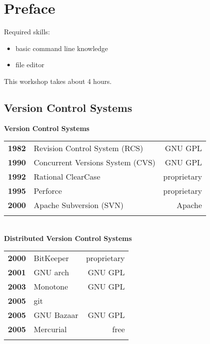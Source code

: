 \section{Preface}
\begin{frame}
  \slidetitle

  Required skills:
  \begin{itemize}
    \item basic command line knowledge
    \item file editor
  \end{itemize}
  \vspace{1em}
  This workshop takes about 4 hours.
\end{frame}

\subsection{Version Control Systems}
\begin{frame}
  \subslidetitle

  \textbf{Version Control Systems}
  \pause
  \\
  \begin{tabular}{lp{5cm}r}
    \textbf{1982} & Revision Control System (RCS) & GNU GPL \\
    \pause
    \textbf{1990} & Concurrent Versions System (CVS) & GNU GPL \\
    \pause
    \textbf{1992} & Rational ClearCase & proprietary \\
    \pause
    \textbf{1995} & Perforce  & proprietary \\
    \pause
    \textbf{2000} & Apache Subversion (SVN)  & Apache \\
    \pause
  \end{tabular}
  \\
  \textbf{Distributed Version Control Systems}
  \pause
  \\
  \begin{tabular}{lp{5cm}r}
    \textbf{2000} & BitKeeper  & proprietary \\
    \pause
    \textbf{2001} & GNU arch   & GNU GPL \\
    \pause
    \textbf{2003} & Monotone   & GNU GPL \\
    \pause
    \textbf{2005} & git \\
    \pause
    \textbf{2005} & GNU Bazaar & GNU GPL \\
    \pause
    \textbf{2005} & Mercurial  & free \\
    \pause
  \end{tabular}

\end{frame}

